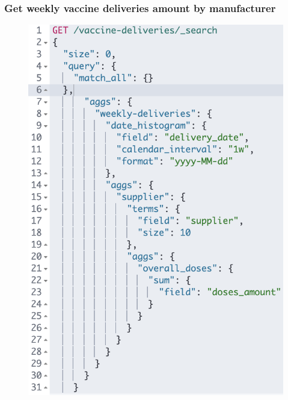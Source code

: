 \documentclass{article}[IEEEtran]
\begin{document}
\subsubsection{Get weekly vaccine deliveries amount by manufacturer}\label{ssec:q16}


\begin{figure}[H]
\begin{center}
\begin{minipage}[b]{0.4\textwidth}
    \includegraphics[width=\textwidth, frame]{Query_12.PNG}
    \subcaption{}
  \end{minipage}
  \hfill
  \begin{minipage}[b]{0.4\textwidth}

\end{minipage}
\end{center}
\end{figure}
\end{document}
